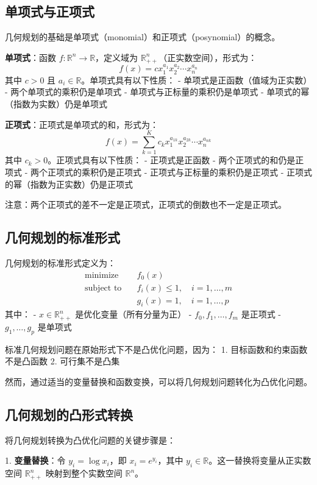 \documentclass[12pt,a4paper]{book}
\begin{document}
\subsection{单项式与正项式}

几何规划的基础是单项式（monomial）和正项式（posynomial）的概念。

\textbf{单项式}：函数 $f: \mathbb{R}^n \to \mathbb{R}$，定义域为 $\mathbb{R}_{++}^n$（正实数空间），形式为：
$$
f(x) = c x_1^{a_1} x_2^{a_2} \cdots x_n^{a_n}
$$
其中 $c > 0$ 且 $a_i \in \mathbb{R}$。单项式具有以下性质：
- 单项式是正函数（值域为正实数）
- 两个单项式的乘积仍是单项式
- 单项式与正标量的乘积仍是单项式
- 单项式的幂（指数为实数）仍是单项式

\textbf{正项式}：正项式是单项式的和，形式为：
$$
f(x) = \sum_{k=1}^K c_k x_1^{a_{1k}} x_2^{a_{2k}} \cdots x_n^{a_{nk}}
$$
其中 $c_k > 0$。正项式具有以下性质：
- 正项式是正函数
- 两个正项式的和仍是正项式
- 两个正项式的乘积仍是正项式
- 正项式与正标量的乘积仍是正项式
- 正项式的幂（指数为正实数）仍是正项式

注意：两个正项式的差不一定是正项式，正项式的倒数也不一定是正项式。

\subsection{几何规划的标准形式}

几何规划的标准形式定义为：
$$
\begin{aligned}
\text{minimize} \quad & f_0(x) \\
\text{subject to} \quad & f_i(x) \leq 1, \quad i = 1, \dots, m \\
& g_i(x) = 1, \quad i = 1, \dots, p
\end{aligned}
$$
其中：
- $x \in \mathbb{R}_{++}^n$ 是优化变量（所有分量为正）
- $f_0, f_1, \dots, f_m$ 是正项式
- $g_1, \dots, g_p$ 是单项式

标准几何规划问题在原始形式下不是凸优化问题，因为：
1. 目标函数和约束函数不是凸函数
2. 可行集不是凸集

然而，通过适当的变量替换和函数变换，可以将几何规划问题转化为凸优化问题。

\subsection{几何规划的凸形式转换}

将几何规划转换为凸优化问题的关键步骤是：

1. \textbf{变量替换}：令 $y_i = \log x_i$，即 $x_i = e^{y_i}$，其中 $y_i \in \mathbb{R}$。这一替换将变量从正实数空间 $\mathbb{R}_{++}^n$ 映射到整个实数空间 $\mathbb{R}^n$。
\end{document}
